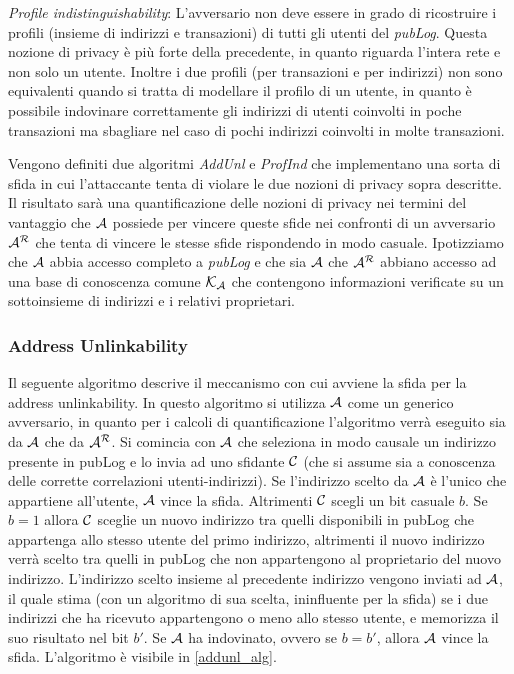 \emph{Profile indistinguishability}: L'avversario non deve essere in grado di ricostruire i profili (insieme di indirizzi e transazioni) di tutti gli utenti del \emph{pubLog}. Questa nozione di privacy è più forte della precedente, in quanto riguarda l'intera rete e non solo un utente. Inoltre i due profili (per transazioni e per indirizzi) non sono equivalenti quando si tratta di modellare il profilo di un utente, in quanto è possibile indovinare correttamente gli indirizzi di utenti coinvolti in poche transazioni ma sbagliare nel caso di pochi indirizzi coinvolti in molte transazioni.

Vengono definiti due algoritmi \emph{AddUnl} e \emph{ProfInd} che implementano una sorta di sfida in cui l'attaccante tenta di violare le due nozioni di privacy sopra descritte. Il risultato sarà una quantificazione delle nozioni di privacy nei termini del vantaggio che $\mathcal{A}$ possiede per vincere queste sfide nei confronti di un avversario $\mathcal{A}^\mathcal{R}$ che tenta di vincere le stesse sfide rispondendo in modo casuale. Ipotizziamo che $\mathcal{A}$ abbia accesso completo a \emph{pubLog} e che sia $\mathcal{A}$ che $\mathcal{A}^\mathcal{R}$ abbiano accesso ad una base di conoscenza comune $\mathcal{K}_\mathcal{A}$ che contengono informazioni verificate su un sottoinsieme di indirizzi e i relativi proprietari.

\subsubsection{Address Unlinkability}\label{address-unlinkability}

Il seguente algoritmo descrive il meccanismo con cui avviene la sfida per la address unlinkability. In questo algoritmo si utilizza $\mathcal{A}$ come un generico avversario, in quanto per i calcoli di quantificazione l'algoritmo verrà eseguito sia da $\mathcal{A}$ che da $\mathcal{A}^\mathcal{R}$. Si comincia con $\mathcal{A}$ che seleziona in modo causale un indirizzo presente in pubLog e lo invia ad uno sfidante $\mathcal{C}$ (che si assume sia a conoscenza delle corrette correlazioni utenti-indirizzi). Se l'indirizzo scelto da $\mathcal{A}$ è l'unico che appartiene all'utente, $\mathcal{A}$ vince la sfida. Altrimenti $\mathcal{C}$ scegli un bit casuale $\mathit{b}$. Se $\mathit{b} = 1$ allora $\mathcal{C}$ sceglie un nuovo indirizzo tra quelli disponibili in pubLog che appartenga allo stesso utente del primo indirizzo, altrimenti il nuovo indirizzo verrà scelto tra quelli in pubLog che non appartengono al proprietario del nuovo indirizzo. L'indirizzo scelto insieme al precedente indirizzo vengono inviati ad $\mathcal{A}$, il quale stima (con un algoritmo di sua scelta, ininfluente per la sfida) se i due indirizzi che ha ricevuto appartengono o meno allo stesso utente, e memorizza il suo risultato nel bit $\mathit{b}'$. Se $\mathcal{A}$ ha indovinato, ovvero se $\mathit{b} = \mathit{b}'$, allora $\mathcal{A}$ vince la sfida. L'algoritmo è visibile in \ref{addunl_alg}.

